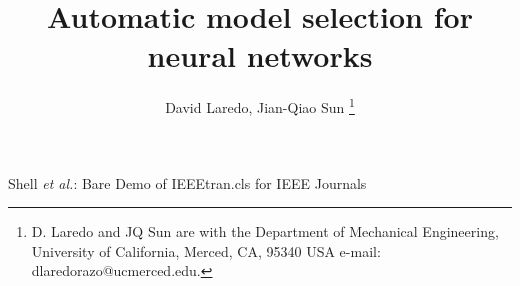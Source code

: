 \documentclass[journal]{IEEEtran}
\begin{document}
%

\title{Automatic model selection for neural networks}
%
%
%

\author{David Laredo, Jian-Qiao Sun%
\thanks{D. Laredo and JQ Sun are with the Department of Mechanical Engineering, University of California, Merced,
CA, 95340 USA e-mail: dlaredorazo@ucmerced.edu.}}%

% 
%



%
{Shell \MakeLowercase{\textit{et al.}}: Bare Demo of IEEEtran.cls for IEEE Journals}
% 
\end{document}
